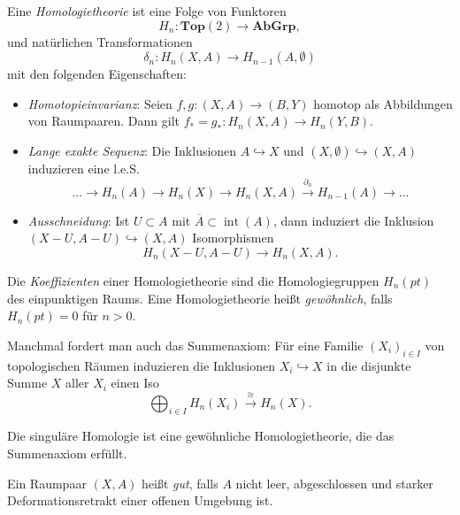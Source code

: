 \documentclass{cheat-sheet}
\newcommand{\Top}{\mathbf{Top}} %
\newcommand{\AbGrp}{\mathbf{AbGrp}} %
\newcommand{\inte}{\mathop{\mathrm{int}}} %
\newcommand{\clos}[1]{\overline{#1}} %
\begin{document}



\begin{defn}
  Eine \emph{Homologietheorie} ist eine Folge von Funktoren
  \[ H_n : \Top(2) \to \AbGrp, \]
  und natürlichen Transformationen
  \[ \delta_n : H_n(X, A) \to H_{n-1}(A, \emptyset) \]
  mit den folgenden Eigenschaften:
  \begin{itemize}
    \item \emph{Homotopieinvarianz}: Seien $f, g : (X, A) \to (B, Y)$ homotop als Abbildungen von Raumpaaren. Dann gilt $f_* = g_* : H_n(X, A) \to H_n(Y, B)$.
    \item \emph{Lange exakte Sequenz}: Die Inklusionen $A \hookrightarrow X$ und $(X, \emptyset) \hookrightarrow (X, A)$ induzieren eine l.e.S.
    \[ ... \to H_n(A) \to H_n(X) \to H_n(X, A) \xrightarrow{\partial_n} H_{n-1}(A) \to ... \]
    \item \emph{Ausschneidung}: Ist $U \subset A$ mit $\clos{A} \subset \inte(A)$, dann induziert die Inklusion $(X - U, A - U) \hookrightarrow (X, A)$ Isomorphismen
    \[ H_n(X-U, A-U) \to H_n(X,A). \]
  \end{itemize}
\end{defn}

\begin{defn}
  Die \emph{Koeffizienten} einer Homologietheorie sind die Homologiegruppen $H_n(pt)$ des einpunktigen Raums.
  Eine Homologietheorie heißt \emph{gewöhnlich}, falls $H_n(pt) = 0$ für $n > 0$.
\end{defn}

\begin{bem}
  Manchmal fordert man auch das Summenaxiom: Für eine Familie $(X_i)_{i \in I}$ von topologischen Räumen induzieren die Inklusionen $X_i \hookrightarrow X$ in die disjunkte Summe $X$ aller $X_i$ einen Iso
  \[ \bigoplus_{i \in I} H_n(X_i) \xrightarrow{\cong} H_n(X). \]
\end{bem}

\begin{bem}
  Die singuläre Homologie ist eine gewöhnliche Homologietheorie, die das Summenaxiom erfüllt.
\end{bem}


\begin{defn}
  Ein Raumpaar $(X, A)$ heißt \emph{gut}, falls $A$ nicht leer, abgeschlossen und starker Deformationsretrakt einer offenen Umgebung ist.
\end{defn}
\end{document}
